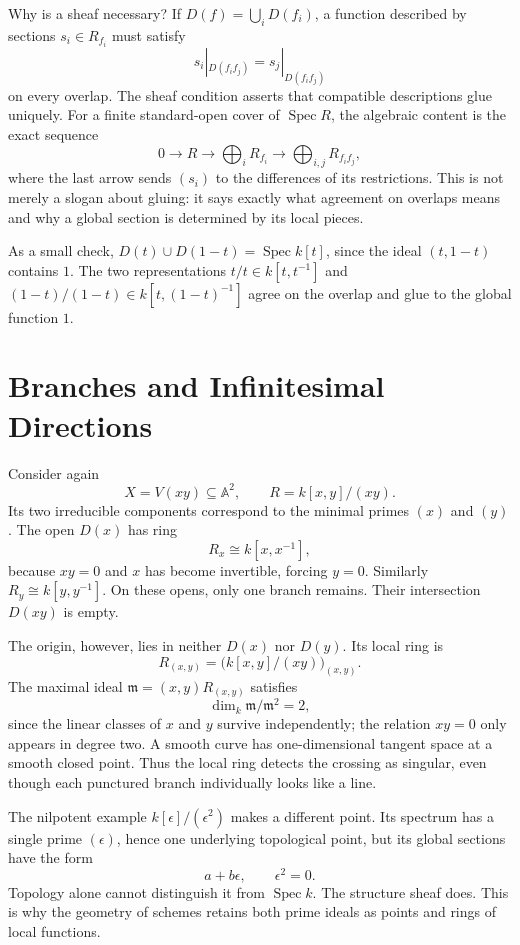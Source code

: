 Why is a sheaf necessary? If \(D(f)=\bigcup_iD(f_i)\), a function described by sections \(s_i\in R_{f_i}\) must satisfy
\[
 s_i|_{D(f_if_j)}=s_j|_{D(f_if_j)}
\]
on every overlap. The sheaf condition asserts that compatible descriptions glue uniquely. For a finite standard-open cover of \(\operatorname{Spec}R\), the algebraic content is the exact sequence
\[
 0\longrightarrow R\longrightarrow\bigoplus_i R_{f_i}
 \longrightarrow\bigoplus_{i,j}R_{f_if_j},
\]
where the last arrow sends \((s_i)\) to the differences of its restrictions. This is not merely a slogan about gluing: it says exactly what agreement on overlaps means and why a global section is determined by its local pieces.

As a small check, \(D(t)\cup D(1-t)=\operatorname{Spec}k[t]\), since the ideal \((t,1-t)\) contains \(1\). The two representations \(t/t\in k[t,t^{-1}]\) and \((1-t)/(1-t)\in k[t,(1-t)^{-1}]\) agree on the overlap and glue to the global function \(1\).

\section{Branches and Infinitesimal Directions}

Consider again
\[
 X=V(xy)\subseteq\mathbb A^2,\qquad R=k[x,y]/(xy).
\]
Its two irreducible components correspond to the minimal primes \((x)\) and \((y)\). The open \(D(x)\) has ring
\[
 R_x\cong k[x,x^{-1}],
\]
because \(xy=0\) and \(x\) has become invertible, forcing \(y=0\). Similarly \(R_y\cong k[y,y^{-1}]\). On these opens, only one branch remains. Their intersection \(D(xy)\) is empty.

The origin, however, lies in neither \(D(x)\) nor \(D(y)\). Its local ring is
\[
 R_{(x,y)}=\bigl(k[x,y]/(xy)\bigr)_{(x,y)}.
\]
The maximal ideal \(\mathfrak m=(x,y)R_{(x,y)}\) satisfies
\[
 \dim_k\mathfrak m/\mathfrak m^2=2,
\]
since the linear classes of \(x\) and \(y\) survive independently; the relation \(xy=0\) only appears in degree two. A smooth curve has one-dimensional tangent space at a smooth closed point. Thus the local ring detects the crossing as singular, even though each punctured branch individually looks like a line.

The nilpotent example \(k[\epsilon]/(\epsilon^2)\) makes a different point. Its spectrum has a single prime \((\epsilon)\), hence one underlying topological point, but its global sections have the form
\[
 a+b\epsilon,\qquad \epsilon^2=0.
\]
Topology alone cannot distinguish it from \(\operatorname{Spec}k\). The structure sheaf does. This is why the geometry of schemes retains both prime ideals as points and rings of local functions.

